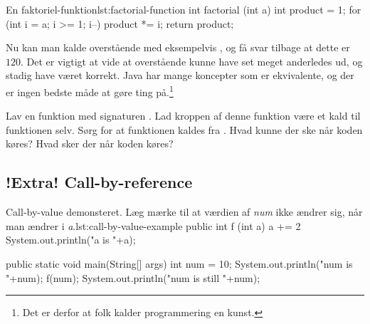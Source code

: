 		\begin{JavaCode}{En faktoriel-funktion}{lst:factorial-function}
			int factorial (int a) {
				int product = 1;
				for (int i = a; i >= 1; i--)
					product *= i;
				return product;
			}
		\end{JavaCode}

        Nu kan man kalde overstående med eksempelvis
        , og få svar tilbage at dette er
        \(120\). Det er vigtigt at vide at overstående kunne have set
        meget anderledes ud, og stadig have været korrekt. Java har
        mange koncepter som er ekvivalente, og der er ingen bedste
        måde at gøre ting på.\footnote{Det er derfor at folk kalder
        programmering en kunst.}


        \begin{exercise}
            Lav en funktion med signaturen . Lad
            kroppen af denne funktion være et kald til funktionen
            selv. Sørg for at funktionen kaldes fra .
            Hvad kunne der ske når koden køres? Hvad sker der når
            koden køres?
        \end{exercise}

    \subsection{!Extra! Call-by-reference}



        \begin{JavaCode}{Call-by-value demonsteret. Læg mærke til at værdien af \emph{num} ikke ændrer sig, når man ændrer i \emph{a}.}{lst:call-by-value-example}
            public int f (int a) {
                a += 2
                System.out.println("a is "+a);
            }

            public static void main(String[] args) {
                int num = 10;
                System.out.println("num is "+num);
                f(num);
                System.out.println("num is still "+num);
            }
        \end{JavaCode}

